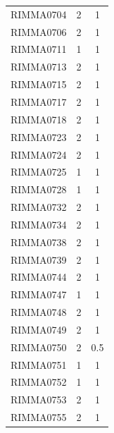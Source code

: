 \documentclass[11pt]{article}
\begin{document}
\begin{linenumbers}
\begin{flushleft}
\begin{table}[htbp]
\begin{tabular}{ccc}
    RIMMA0704 & 2     & 1 \\
    RIMMA0706 & 2     & 1 \\
    RIMMA0711 & 1     & 1 \\
    RIMMA0713 & 2     & 1 \\
    RIMMA0715 & 2     & 1 \\
    RIMMA0717 & 2     & 1 \\
    RIMMA0718 & 2     & 1 \\
    RIMMA0723 & 2     & 1 \\
    RIMMA0724 & 2     & 1 \\
    RIMMA0725 & 1     & 1 \\
    RIMMA0728 & 1     & 1 \\
    RIMMA0732 & 2     & 1 \\
    RIMMA0734 & 2     & 1 \\
    RIMMA0738 & 2     & 1 \\
    RIMMA0739 & 2     & 1 \\
    RIMMA0744 & 2     & 1 \\
    RIMMA0747 & 1     & 1 \\
    RIMMA0748 & 2     & 1 \\
    RIMMA0749 & 2     & 1 \\
    RIMMA0750 & 2     & 0.5 \\
    RIMMA0751 & 1     & 1 \\
    RIMMA0752 & 1     & 1 \\
    RIMMA0753 & 2     & 1 \\
    RIMMA0755 & 2     & 1 \\
    \bottomrule
    \end{tabular}
  \label{TableS2Mays}
\end{table}



\end{flushleft}
\end{linenumbers}
\end{document}
